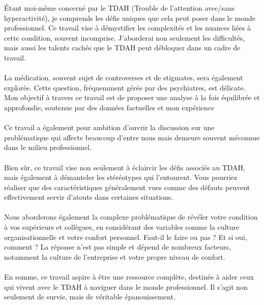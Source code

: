 Étant moi-même concerné par le TDAH (Trouble de l'attention avec/sans hyperactivité), je comprends les défis uniques que cela peut poser dans le monde professionnel. Ce travail vise à démystifier les complexités et les nuances liées à cette condition, souvent incomprise. J'aborderai non seulement les difficultés, mais aussi les talents cachés que le TDAH peut débloquer dans un cadre de travail.
\\
\\
La médication, souvent sujet de controverses et de stigmates, sera également explorée. Cette question, fréquemment gérée par des psychiatres, est délicate. Mon objectif à travers ce travail est de proposer une analyse à la fois équilibrée et approfondie, soutenue par des données factuelles et mon expérience 
\\
\\
Ce travail a également pour ambition d'ouvrir la discussion sur une problématique qui affecte beaucoup d'entre nous mais demeure souvent méconnue dans le milieu professionnel.
\\
\\
Bien sûr, ce travail vise non seulement à éclaircir les défis associés au TDAH, mais également à démanteler les stéréotypes qui l'entourent. Vous pourriez réaliser que des caractéristiques généralement vues comme des défauts peuvent effectivement servir d'atouts dans certaines situations.
\\
\\
Nous aborderons également la complexe problématique de révéler votre condition à vos supérieurs et collègues, en considérant des variables comme la culture organisationnelle et votre confort personnel. Faut-il le faire ou pas ? Et si oui, comment ? La réponse n'est pas simple et dépend de nombreux facteurs, notamment la culture de l'entreprise et votre propre niveau de confort.
\\
\\
En somme, ce travail aspire à être une ressource complète, destinée à aider ceux qui vivent avec le TDAH à naviguer dans le monde professionnel. Il s'agit non seulement de survie, mais de véritable épanouissement.
\\
\\
